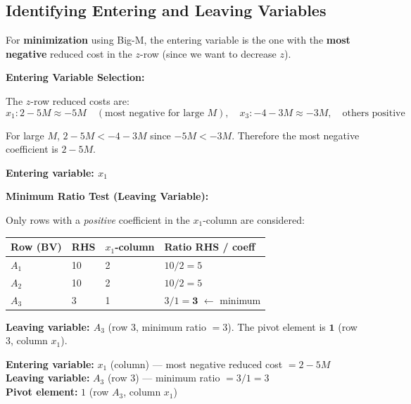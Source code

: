 \documentclass[12pt]{article}
\newcommand{\hcell}[1]{\textbf{\color{white}#1}}
\begin{document}
\vspace{10pt}

\subsection*{Identifying Entering and Leaving Variables}

\begin{conceptbox}
For \textbf{minimization} using Big-M, the entering variable is the one with the \textbf{most negative} reduced cost in the $z$-row (since we want to decrease $z$).
\end{conceptbox}

\medskip
\noindent\textbf{Entering Variable Selection:}

The $z$-row reduced costs are:
\[
  x_1: 2-5M \approx -5M \quad(\text{most negative for large } M),
  \quad x_3: -4-3M \approx -3M,
  \quad \text{others positive}
\]

For large $M$, $2 - 5M < -4 - 3M$ since $-5M < -3M$.
Therefore the most negative coefficient is $2 - 5M$.

\medskip
\noindent\textbf{Entering variable: $x_1$}

\medskip
\noindent\textbf{Minimum Ratio Test (Leaving Variable):}

Only rows with a \emph{positive} coefficient in the $x_1$-column are considered:

\begin{center}
\begin{tabular}{C{2.2cm} C{2.5cm} C{2.5cm} C{3cm}}
\toprule
{}
\hcell{Row (BV)} & \hcell{RHS} & \hcell{$x_1$-column} & \hcell{Ratio RHS / coeff} \\
\midrule
{}
$A_1$ & 10 & 2 & $10/2 = 5$ \\
$A_2$ & 10 & 2 & $10/2 = 5$ \\
$A_3$ & 3  & 1 & $3/1 = \mathbf{3}$ \quad $\leftarrow$ minimum \\
\bottomrule
\end{tabular}
\end{center}

\textbf{Leaving variable: $A_3$} (row 3, minimum ratio $= 3$). The pivot element is $\mathbf{1}$ (row 3, column $x_1$).

\begin{answerbox}
\textbf{Entering variable:} $x_1$ \quad (column) \;---\; most negative reduced cost $= 2 - 5M$\\[4pt]
\textbf{Leaving variable:} $A_3$ \quad (row 3) \;---\; minimum ratio $= 3/1 = 3$\\[4pt]
\textbf{Pivot element:} $1$ \quad (row $A_3$, column $x_1$)
\end{answerbox}
\end{document}
